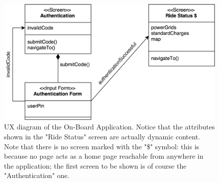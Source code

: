 \begin{figure}[H]
\begin{center}
		\includegraphics[width=\textwidth]{./user_interface_design/diagrams/on_board_ux.png}
		\caption{UX diagram of the On-Board Application. Notice that the attributes shown in the "Ride Status" screen are actually dynamic content. Note that there is no screen marked with the "\$" symbol: this is because no page acts as a home page reachable from anywhere in the application; the first screen to be shown is of course the "Authentication" one.}
		\label{on_board_ux}
\end{center}
\end{figure}